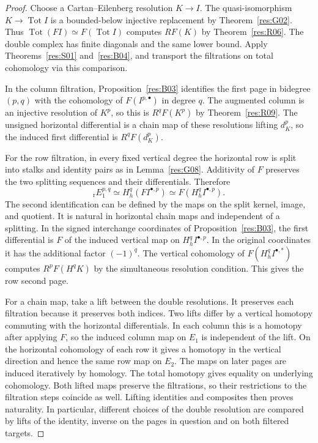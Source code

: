 \begin{proof}
Choose a Cartan--Eilenberg resolution \(K\to I\). The
quasi-isomorphism \(K\to\operatorname{Tot}I\) is a bounded-below
injective replacement by Theorem~\ref{res:G02}. Thus
\(\operatorname{Tot}(FI)\simeq F(\operatorname{Tot}I)\) computes
\(RF(K)\) by Theorem~\ref{res:R06}. The double complex has finite
diagonals and the same lower bound. Apply Theorems~\ref{res:S01}
and~\ref{res:B04}, and transport the filtrations on total
cohomology via this comparison.

In the column filtration, Proposition~\ref{res:B03} identifies
the first page in bidegree \((p,q)\) with the cohomology of
\(F(I^{p,\bullet})\) in degree \(q\). The augmented column is an
injective resolution of \(K^p\), so this is \(R^qF(K^p)\) by
Theorem~\ref{res:R09}. The unsigned horizontal differential
is a chain map of these resolutions lifting \(d_K^p\), so the
induced first differential is \(R^qF(d_K^p)\).

For the row filtration, in every fixed vertical degree the
horizontal row is split into stalks and identity pairs as in
Lemma~\ref{res:G08}. Additivity of \(F\)
preserves the two splitting sequences and their differentials.
Therefore
\[
 {}_{\mathrm r}E_1^{p,q}
    \simeq H_h^q(FI^{\bullet,p})
    \simeq F(H_h^q I^{\bullet,p}).
\]
The second identification can be defined by the maps on the
split kernel, image, and quotient. It is natural in horizontal
chain maps and independent of a splitting. In the signed
interchange coordinates of Proposition~\ref{res:B03}, the
first differential is \(F\) of the induced vertical map on
\(H_h^q I^{\bullet,p}\). In the original coordinates it has the
additional factor \((-1)^q\). The vertical cohomology of
\(F(H_h^q I^{\bullet,*})\) computes \(R^pF(H^qK)\) by the
simultaneous resolution condition. This gives the row second page.

For a chain map, take a lift between the double resolutions.
It preserves each filtration because it preserves both indices.
Two lifts differ by a vertical homotopy commuting with the
horizontal differentials. In each column this is a homotopy
after applying \(F\), so the induced column map on \(E_1\) is
independent of the lift. On the horizontal cohomology of each
row it gives a homotopy in the vertical direction and hence the
same row map on \(E_2\). The maps on later pages are induced
iteratively by homology. The total homotopy gives equality on
underlying cohomology. Both lifted maps preserve the filtrations,
so their restrictions to the filtration steps coincide as well.
Lifting identities and composites then proves naturality.
In particular, different choices of the double resolution
are compared by lifts of the identity, inverse on the pages
in question and on both filtered targets.


\end{proof}
